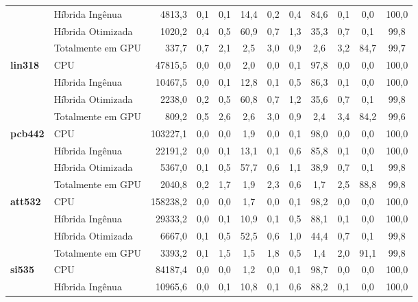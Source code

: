 \begin{tabeladensa}
\begin{longtable}[]{@{}llrccccccccc@{}}
                     & Híbrida Ingênua   & 4813,3   & 0,1 & 0,1 & 14,4 & 0,2  & 0,4 & 84,6 & 0,1  & 0,0  & 100,0 \\*
                     & Híbrida Otimizada & 1020,2   & 0,4 & 0,5 & 60,9 & 0,7  & 1,3 & 35,3 & 0,7  & 0,1  & 99,8  \\*
                     & Totalmente em GPU & 337,7    & 0,7 & 2,1 & 2,5  & 3,0  & 0,9 & 2,6  & 3,2  & 84,7 & 99,7  \\
  \midrule
  \textbf{lin318}    & CPU               & 47815,5  & 0,0 & 0,0 & 2,0  & 0,0  & 0,1 & 97,8 & 0,0  & 0,0  & 100,0 \\*
                     & Híbrida Ingênua   & 10467,5  & 0,0 & 0,1 & 12,8 & 0,1  & 0,5 & 86,3 & 0,1  & 0,0  & 100,0 \\*
                     & Híbrida Otimizada & 2238,0   & 0,2 & 0,5 & 60,8 & 0,7  & 1,2 & 35,6 & 0,7  & 0,1  & 99,8  \\*
                     & Totalmente em GPU & 809,2    & 0,5 & 2,6 & 2,6  & 3,0  & 0,9 & 2,4  & 3,4  & 84,2 & 99,6  \\
  \midrule
  \textbf{pcb442}    & CPU               & 103227,1 & 0,0 & 0,0 & 1,9  & 0,0  & 0,1 & 98,0 & 0,0  & 0,0  & 100,0 \\*
                     & Híbrida Ingênua   & 22191,2  & 0,0 & 0,1 & 13,1 & 0,1  & 0,6 & 85,8 & 0,1  & 0,0  & 100,0 \\*
                     & Híbrida Otimizada & 5367,0   & 0,1 & 0,5 & 57,7 & 0,6  & 1,1 & 38,9 & 0,7  & 0,1  & 99,8  \\*
                     & Totalmente em GPU & 2040,8   & 0,2 & 1,7 & 1,9  & 2,3  & 0,6 & 1,7  & 2,5  & 88,8 & 99,8  \\
  \midrule
  \textbf{att532}    & CPU               & 158238,2 & 0,0 & 0,0 & 1,7  & 0,0  & 0,1 & 98,2 & 0,0  & 0,0  & 100,0 \\*
                     & Híbrida Ingênua   & 29333,2  & 0,0 & 0,1 & 10,9 & 0,1  & 0,5 & 88,1 & 0,1  & 0,0  & 100,0 \\*
                     & Híbrida Otimizada & 6667,0   & 0,1 & 0,5 & 52,5 & 0,6  & 1,0 & 44,4 & 0,7  & 0,1  & 99,8  \\*
                     & Totalmente em GPU & 3393,2   & 0,1 & 1,5 & 1,5  & 1,8  & 0,5 & 1,4  & 2,0  & 91,1 & 99,8  \\
  \midrule
  \textbf{si535}     & CPU               & 84187,4  & 0,0 & 0,0 & 1,2  & 0,0  & 0,1 & 98,7 & 0,0  & 0,0  & 100,0 \\*
                     & Híbrida Ingênua   & 10965,6  & 0,0 & 0,1 & 10,8 & 0,1  & 0,6 & 88,2 & 0,1  & 0,0  & 100,0 \\*

\end{longtable}
\end{tabeladensa}
